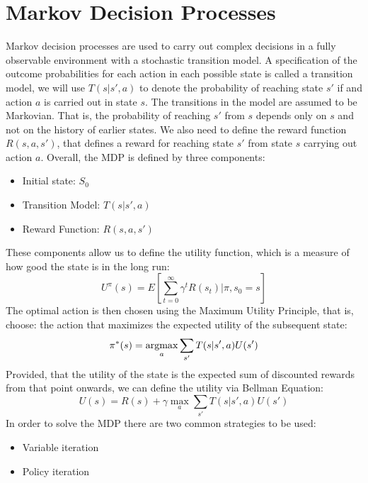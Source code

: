 \section{Markov Decision Processes}
\label{sec:markov_descision_processes}
Markov decision processes are used to carry out complex decisions in a fully
observable environment with a stochastic transition model.
A specification of the outcome probabilities for each action in each possible state is
called a transition model, we will use $T(s| s', a)$ to denote the
probability of reaching state $s'$ if and action $a$ is carried out in state
$s$.
The transitions in the model are assumed to be Markovian. That is, the probability of
reaching $s'$ from $s$ depends only on $s$ and not on the history of earlier
states.
We also need to define the reward function $R(s, a, s')$, that defines a reward
for reaching state $s'$ from state $s$ carrying out action $a$.
Overall, the MDP is defined by three components:
\begin{itemize}
    \item Initial state: $S_0$
    \item Transition Model: $T(s| s', a)$
    \item Reward Function: $R(s, a, s')$
\end{itemize}
These components allow us to define the utility function, which is a measure of
how good the state is in the long run:
\begin{equation}
U^{\pi}(s) = E\left[\sum_{t=0}^{\infty} \gamma^t R(s_t) | \pi,s_0 = s \right]
\end{equation}
The optimal action is then chosen using the Maximum Utility Principle, that is,
choose: the action that maximizes the expected utility of the subsequent state:
\begin{equation}
\label{lbl:optimal_policy}
\pi^*(s) = \mathop{\rm argmax}_a \sum_{s'} T(s| s', a)U(s')
\end{equation}
Provided, that the utility of the state is the expected sum of discounted
rewards from that point onwards, we can define the utility via Bellman Equation:
\begin{equation}
\label{lbl:bellman_equation}
    U(s) = R(s) + \gamma \max_a \sum_{s'}T(s| s', a)U(s')
\end{equation}
In order to solve the MDP there are two common strategies to be used:
\begin{itemize}
    \item Variable iteration
    \item Policy iteration
\end{itemize}
